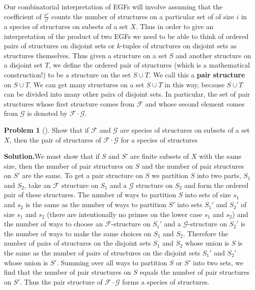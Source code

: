 \documentclass[10pt,]{book}
\newcommand{\terminology}[1]{\textbf{#1}}
\theoremstyle{plain}
\theoremstyle{definition}
\newtheorem{activity}[project]{Problem}
\theoremstyle{definition}
\numberwithin{equation}{chapter}
\newcommand{\F}{\mathcal{F}}
\begin{document}
Our combinatorial interpretation of EGFs will involve assuming that the coefficient of \(\frac{x^i}{i!}\) counts the number of structures on a particular set of of size \(i\) in a species of structures on subsets of a set \(X\). Thus in order to give an interpretation of the product of two EGFs we need to be able to think of ordered pairs of structures on disjoint sets or \(k\)-tuples of structures on disjoint sets as structures themselves. Thus given a structure on a set \(S\) and another structure on a disjoint set \(T\), we define the ordered pair of structures (which is a mathematical construction!) to be a structure on the set \(S\cup T\). We call this a \terminology{pair structure} on \(S\cup T\). We can get many structures on a set \(S\cup T\) in this way, because \(S\cup T\) can be divided into many other pairs of disjoint sets. In particular, the set of pair structures whose first structure comes from \(\F\) and whose second element comes from \(\mathcal{G}\) is denoted by \(\F\cdot \mathcal{G}\).%
\begin{activity}[]\label{activity-396}
Show that if \(\F\) and \(\mathcal{G}\) are species of structures on subsets of a set \(X\), then the pair of structures of \(\F\cdot\mathcal{G}\) for a species of structures%
\par\medskip\noindent%
\textbf{Solution.}\quad We must show that if \(S\) and \(S'\) are finite subsets of \(X\) with the same size, then the number of pair structures on \(S\) and the number of pair structures on \(S'\) are the same. To get a pair structure on \(S\) we partition \(S\) into two parts, \(S_1\) and \(S_2\), take an \(\F\) structure on \(S_1\) and a \(\mathcal{G}\) structure on \(S_2\) and form the ordered pair of these structures. The number of ways to partition \(S\) into sets of size \(s_1\) and \(s_2\) is the same as the number of ways to partition \(S'\) into sets \(S_1'\) and \(S_2'\) of size \(s_1\) and \(s_2\) (there are intentionally no primes on the lower case \(s_1\) and \(s_2\)) and the number of ways to choose an \(\F\)-structure on \(S_1'\) and a \(\mathcal{G}\)-structure on \(S_2'\) is the number of ways to make the same choices on \(S_1\) and \(S_2\). Therefore the number of pairs of structures on the disjoint sets \(S_1\) and \(S_2\) whose union is \(S\) is the same as the number of pairs of structures on the disjoint sets \(S_1'\) and \(S_2'\) whose union is \(S'\). Summing over all ways to partition \(S\) or \(S'\) into two sets, we find that the number of pair structures on \(S\) equals the number of pair structures on \(S'\). Thus the pair structure of \(\F\cdot \mathcal{G}\) forms a species of structures.%
\end{activity}
\end{document}
